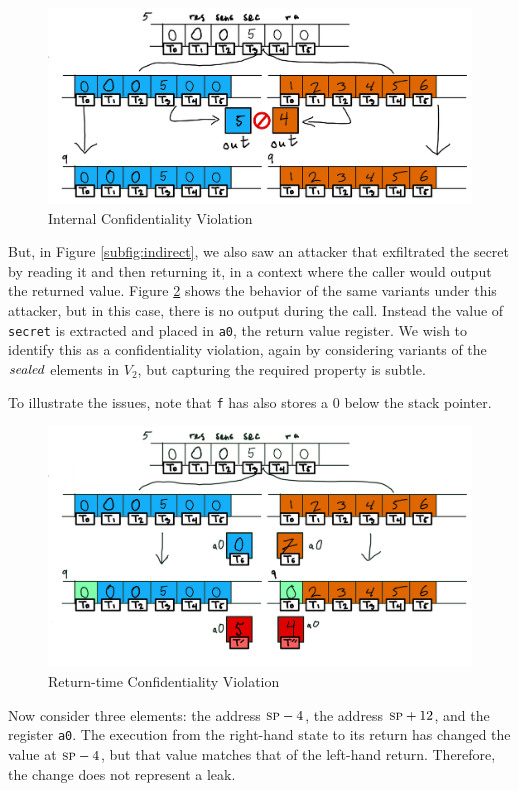 \documentclass[10pt,conference]{ieeetran}%
\theoremstyle{definition}
\begin{document}
\begin{figure}
  \includegraphics[width=\columnwidth]{variants2.png}
  \caption{Internal Confidentiality Violation}
  \label{fig:variant2}
\end{figure}

But, in Figure \ref{subfig:indirect}, we also saw an attacker that exfiltrated the secret
by reading it and then returning it, in a context where the caller would output the returned
value. Figure \ref{fig:variant3} shows the behavior of the same variants under this attacker,
but in this case, there is no output during the call. Instead the value of {\tt secret} is
extracted and placed in {\tt a0}, the return value register. We wish to identify this as
a confidentiality violation, again by considering variants of the \(\mathit{sealed}\)
elements in \(V_2\), but capturing the required property is subtle.

To illustrate the issues, note that {\tt f} has also stores a 0 below the stack pointer.
%
\begin{figure}
  \includegraphics[width=\columnwidth]{variants3.png}
  \caption{Return-time Confidentiality Violation}
  \label{fig:variant3}
\end{figure}
%
Now consider three elements: the address \(\textsc{sp} - 4\), the address \(\textsc{sp} + 12\),
and the register {\tt a0}. The execution from the right-hand state to its return
has changed the value at \(\textsc{sp} - 4\), but that value matches that of the
left-hand return. Therefore, the change does not represent a leak.
\end{document}
